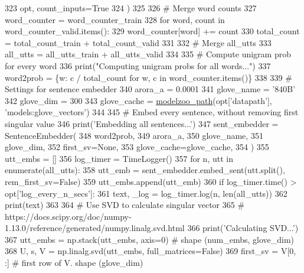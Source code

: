 \begin{DoxyCode}
323         opt, count\_inputs=\textcolor{keyword}{True}
324     )
325 
326     \textcolor{comment}{# Merge word counts}
327     word\_counter = word\_counter\_train
328     \textcolor{keywordflow}{for} word, count \textcolor{keywordflow}{in} word\_counter\_valid.items():
329         word\_counter[word] += count
330     total\_count = total\_count\_train + total\_count\_valid
331 
332     \textcolor{comment}{# Merge all\_utts}
333     all\_utts = all\_utts\_train + all\_utts\_valid
334 
335     \textcolor{comment}{# Compute unigram prob for every word}
336     print(\textcolor{stringliteral}{"Computing unigram probs for all words..."})
337     word2prob = \{w: c / total\_count \textcolor{keywordflow}{for} w, c \textcolor{keywordflow}{in} word\_counter.items()\}
338 
339     \textcolor{comment}{# Settings for sentence embedder}
340     arora\_a = 0.0001
341     glove\_name = \textcolor{stringliteral}{'840B'}
342     glove\_dim = 300
343     glove\_cache = \hyperlink{namespaceparlai_1_1agents_1_1legacy__agents_1_1seq2seq_1_1utils__v0_a5fbd3301b67f00d6d146fb01c7cd7626}{modelzoo\_path}(opt[\textcolor{stringliteral}{'datapath'}], \textcolor{stringliteral}{'models:glove\_vectors'})
344 
345     \textcolor{comment}{# Embed every sentence, without removing first singular value}
346     print(\textcolor{stringliteral}{'Embedding all sentences...'})
347     sent\_embedder = SentenceEmbedder(
348         word2prob,
349         arora\_a,
350         glove\_name,
351         glove\_dim,
352         first\_sv=\textcolor{keywordtype}{None},
353         glove\_cache=glove\_cache,
354     )
355     utt\_embs = []
356     log\_timer = TimeLogger()
357     \textcolor{keywordflow}{for} n, utt \textcolor{keywordflow}{in} enumerate(all\_utts):
358         utt\_emb = sent\_embedder.embed\_sent(utt.split(), rem\_first\_sv=\textcolor{keyword}{False})
359         utt\_embs.append(utt\_emb)
360         \textcolor{keywordflow}{if} log\_timer.time() > opt[\textcolor{stringliteral}{'log\_every\_n\_secs'}]:
361             text, \_log = log\_timer.log(n, len(all\_utts))
362             print(text)
363 
364     \textcolor{comment}{# Use SVD to calculate singular vector}
365     \textcolor{comment}{# https://docs.scipy.org/doc/numpy-1.13.0/reference/generated/numpy.linalg.svd.html}
366     print(\textcolor{stringliteral}{'Calculating SVD...'})
367     utt\_embs = np.stack(utt\_embs, axis=0)  \textcolor{comment}{# shape (num\_embs, glove\_dim)}
368     U, s, V = np.linalg.svd(utt\_embs, full\_matrices=\textcolor{keyword}{False})
369     first\_sv = V[0, :]  \textcolor{comment}{# first row of V. shape (glove\_dim)}

\end{DoxyCode}

